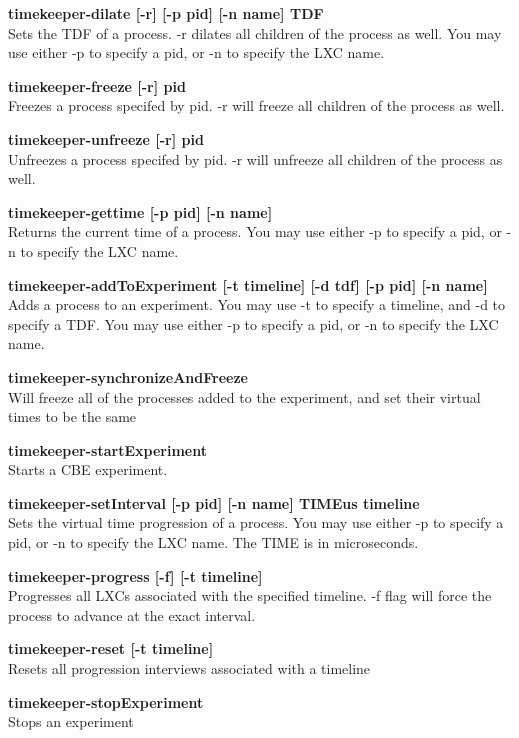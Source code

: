 \begin{description}
 \item \textbf{timekeeper-dilate [-r] [-p pid] [-n name] TDF} \hfill \\
	Sets the TDF of a process. -r dilates all children of the process as well. You may use either -p to specify a pid, or -n to specify the LXC name. 
 \item \textbf{timekeeper-freeze [-r] pid} \hfill \\
	Freezes a process specifed by pid. -r will freeze all children of the process as well.
 \item \textbf{timekeeper-unfreeze [-r] pid} \hfill \\
	Unfreezes a process specifed by pid. -r will unfreeze all children of the process as well.
 \item \textbf{timekeeper-gettime [-p pid] [-n name]} \hfill \\
	Returns the current time of a process. You may use either -p to specify a pid, or -n to specify the LXC name. 

 \item \textbf{timekeeper-addToExperiment [-t timeline] [-d tdf] [-p pid] [-n name]} \hfill \\
	Adds a process to an experiment. You may use -t to specify a timeline, and -d to specify a TDF. You may use either -p to specify a pid, or -n to specify the LXC name.
 \item \textbf{timekeeper-synchronizeAndFreeze} \hfill \\
	Will freeze all of the processes added to the experiment, and set their virtual times to be the same
 \item \textbf{timekeeper-startExperiment} \hfill \\
	Starts a CBE experiment.
 \item \textbf{timekeeper-setInterval [-p pid] [-n name] TIMEus timeline} \hfill \\
	Sets the virtual time progression of a process. You may use either -p to specify a pid, or -n to specify the LXC name. The TIME is in microseconds. 
 \item \textbf{timekeeper-progress [-f] [-t timeline]} \hfill \\
	Progresses all LXCs associated with the specified timeline. -f flag will force the process to advance at the exact interval. 
 \item \textbf{timekeeper-reset [-t timeline]} \hfill \\
        Resets all progression interviews associated with a timeline
 \item \textbf{timekeeper-stopExperiment} \hfill \\
	Stops an experiment
\end{description}

